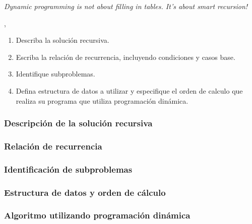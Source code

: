 
\epigraph{\textit{Dynamic programming is not about filling in tables. It's about smart recursion!}}{\citeauthor{algorithms_erickson}, \citeyear{algorithms_erickson} \cite{algorithms_erickson}}

\begin{enumerate}[1)]
    \item Describa la solución recursiva.
    \item Escriba la relación de recurrencia, incluyendo condiciones y casos base.
    \item Identifique subproblemas.
    \item Defina estructura de datos a utilizar y especifique el orden de calculo que realiza su programa que utiliza programación dinámica. 
\end{enumerate}

\subsubsection{Descripción de la solución recursiva}

\subsubsection{Relación de recurrencia}

\subsubsection{Identificación de subproblemas}

\subsubsection{Estructura de datos y orden de cálculo}

\subsubsection{Algoritmo utilizando programación dinámica}



